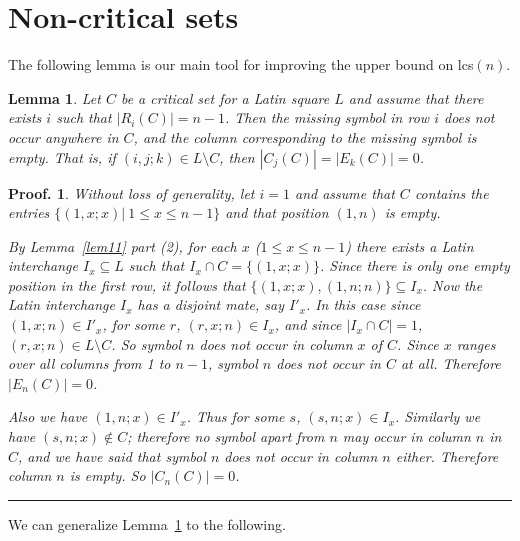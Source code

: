\documentclass[12pt]{report}
\newtheorem{lemma}{Lemma}
\newtheorem{preproof}{{\bf Proof.}}
\newenvironment{proof}[1]{\begin{preproof}{\rm
               #1}\hfill{\rule[-0.5mm]{2mm}{2mm}}}{\end{preproof}}
\def\lcs#1{{\rm lcs}$(#1)$}
\begin{document}
\section{Non-critical sets}    %
%
The following lemma is our main tool for improving the upper bound
on \lcs{n}.
%
\begin{lemma}
\label{3.1}
Let $C$ be a critical set for a Latin square $L$ and assume that
there exists $i$
such that $|R_{i}(C)| = n - 1$.
Then the missing symbol in row $i$ does not occur anywhere in $C$,
and the column corresponding to the missing symbol is empty.
That is, if ${(i, j; k)} \in L\setminus C$, then
$|C_{j}(C)| =|E_{k}(C)| =  0$.
\end{lemma}
%
\begin{proof}{
Without loss of generality, let $i=1$ and assume that
$C$ contains the entries $\{ (1,x;x) |\ 1 \leq x \leq n - 1\}$
and that position $(1,n)$ is empty.

By Lemma~\ref{lem11} part (2), for each $x$  ($1 \leq x \leq n-1 $)
there exists a Latin interchange $I_x \subseteq L$ such that
$I_x \cap C = \{ (1,x;x)\}$.
Since there is only one empty position in the first row, it follows that
$\{ (1,x;x), (1,n;n) \} \subseteq I_x$.  Now the Latin interchange $I_x$
has a disjoint mate, say $I'_x$.  In this case since
$ (1,x;n)  \in I'_x$,  for some $r$, $ (r,x; n)  \in I_x$, and since
$|I_x \cap C| = 1$,  $ (r,x;n) \in L\setminus C$.
So symbol $n$ does not occur in column $x$ of $C$.
Since $x$ ranges over all columns from 1 to $n-1$,
symbol $n$ does not occur in $C$ at all.
Therefore $|E_{n}(C)| = 0$.

Also we have $(1,n;x)  \in I'_x$. Thus for some $s$, $ (s,n;x) \in I_x$.
Similarly we have $ (s,n;x)  \not\in C$; therefore no symbol apart from
$n$ may occur in column $n$ in $C$, and we have said that symbol $n$ does
not occur in column $n$ either. Therefore column $n$ is empty.
So $|C_{n}(C)| = 0$.
}\end{proof}

We can generalize Lemma~\ref{3.1} to the following.
\end{document}
